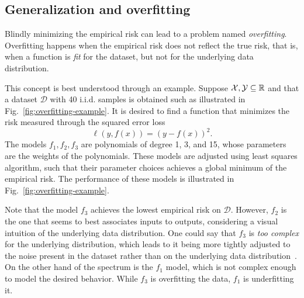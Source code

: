 \subsection{Generalization and overfitting}

Blindly minimizing the empirical risk can lead to a problem named \emph{overfitting}.
Overfitting happens when the empirical risk does not reflect the true risk, that is, when a function is \emph{fit} for the dataset, but not for the underlying data distribution.

This concept is best understood through an example.
Suppose $\mathcal{X},\mathcal{Y}\subseteq\mathbb{R}$ and that a dataset $\mathcal{D}$ with 40 i.i.d. samples is obtained such as illustrated in Fig.~\ref{fig:overfitting-example}.
It is desired to find a function that minimizes the risk measured through the squared error loss \[
    \ell(y,f(x)) = (y-f(x))^2
.\] 
The models $f_1,f_2,f_3$ are polynomials of degree 1, 3, and 15, whose parameters are the weights of the polynomials.
These models are adjusted using least squares algorithm, such that their parameter choices achieves a global minimum of the empirical risk.
The performance of these models is illustrated in Fig.~\ref{fig:overfitting-example}.

Note that the model $f_3$ achieves the lowest empirical risk on $\mathcal{D}$.
However, $f_2$ is the one that seems to best associates inputs to outputs, considering a visual intuition of the underlying data distribution.
One could say that $f_3$ is \emph{too complex} for the underlying distribution, which leads to it being more tightly adjusted to the noise present in the dataset rather than on the underlying data distribution~\cite{murphyMachineLearningProbabilistic2013}.
On the other hand of the spectrum is the $f_1$ model, which is not complex enough to model the desired behavior.
While $f_3$ is overfitting the data, $f_1$ is underfitting it.

